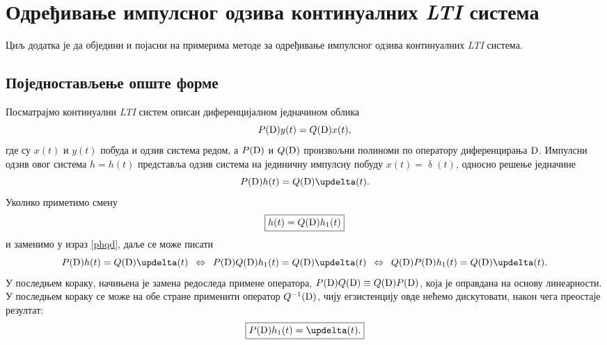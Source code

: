 
\chapter{Одређивање импулсног одзива континуалних 
\textit{LTI} система} \label{a:impulsni_odziv}

Циљ додатка је да обједини и појасни на примерима
методе за одређивање импулсног одзива континуалних 
\textit{LTI} система. 


\section{Поједностављење опште форме}

Посматрајмо континуални \textit{LTI} систем описан 
диференцијалном једначином облика
\begin{equation}
 P({\rm D}) y(t) = Q({\rm D}) x(t),
 \label{def}
\end{equation}
где су $x(t)$ и $y(t)$ побуда и одзив система редом, а  $P({\rm D})$ и $Q({\rm D})$ произвољни полиноми 
по оператору диференцирања $\rm D$. Импулсни  
одзив овог система $h = h(t)$ представља одзив система на 
јединичну импулсну
побуду $x(t) = \updelta(t)$, односно решење једначине
\begin{equation}
 P({\rm D}) h(t) = Q({\rm D}) \updelta(t).
 \label{phqd}
\end{equation}
Уколико приметимо смену 
\begin{equation}
\boxed{
 h(t) = Q({\rm D}) h_1(t)
} \label{hqh1}
\end{equation}
и заменимо у израз \eqref{phqd}, даље се може писати
\begin{equation}
P({\rm D}) h(t) = Q({\rm D}) \updelta(t) 
\enspace\Leftrightarrow\enspace
P({\rm D}) Q({\rm D}) h_1(t) = Q({\rm D}) \updelta(t) 
\enspace\Leftrightarrow\enspace
Q({\rm D}) P({\rm D}) h_1(t) = Q({\rm D}) \updelta(t). 
\end{equation}
У последњем кораку, начињена је замена редоследа 
примене оператора, $P({\rm D}) Q({\rm D})
\equiv Q({\rm D}) P({\rm D})$, која је 
оправдана на основу линеарности. У последњем 
кораку се може на обе стране применити оператор
$Q^{-1}({\rm D})$, чију егзистенцију овде нећемо
дискутовати, након чега преостаје резултат:
\begin{equation}
\boxed{
P({\rm D}) h_1(t) = \updelta(t). 
} \label{eq2}
\end{equation}

\noindent
{} 

